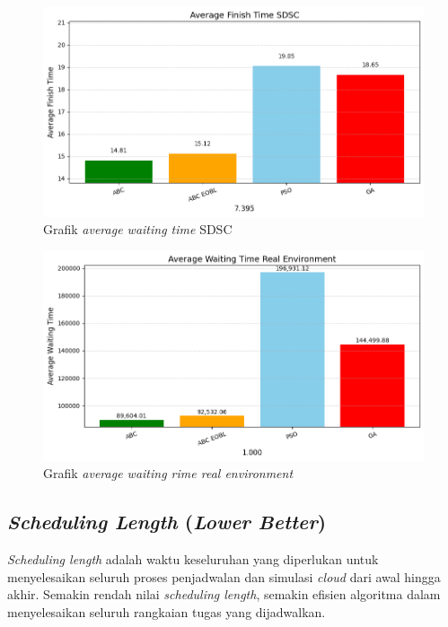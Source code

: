 \begin{figure} [H]
    \centering
    \includegraphics[width=0.75\linewidth]{gambar/Grafik Average Waiting Time SDSC.png}
    \caption{Grafik \textit{average waiting time} SDSC}
\end{figure}

\newpage

\begin{figure} [H]
    \centering
    \includegraphics[width=0.75\linewidth]{gambar/Grafik Average Waiting Time Real Environment.png}
    \caption{Grafik \textit{average waiting rime real environment}}
\end{figure}

\subsection{\textit{Scheduling Length} (\textit{Lower Better})}
\textit{Scheduling length} adalah waktu keseluruhan yang diperlukan untuk menyelesaikan seluruh proses penjadwalan dan simulasi \textit{cloud} dari awal hingga akhir. Semakin rendah nilai \textit{scheduling length}, semakin efisien algoritma dalam menyelesaikan seluruh rangkaian tugas yang dijadwalkan.

